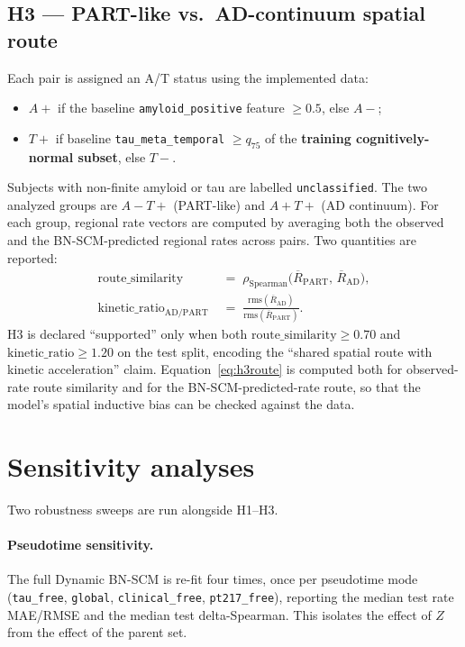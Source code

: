 \documentclass[11pt]{article}
\newcommand{\code}[1]{\texttt{#1}}
\begin{document}
\subsection{H3 --- PART-like vs.\ AD-continuum spatial route}

Each pair is assigned an A/T status using the implemented data:
\begin{itemize}[leftmargin=*,nosep]
  \item $A+$ if the baseline \code{amyloid\_positive} feature $\geq 0.5$, else $A-$;
  \item $T+$ if baseline \code{tau\_meta\_temporal} $\geq q_{75}$ of the \textbf{training cognitively-normal subset}, else $T-$.
\end{itemize}
Subjects with non-finite amyloid or tau are labelled \code{unclassified}.
The two analyzed groups are $A{-}T{+}$ (PART-like) and $A{+}T{+}$ (AD
continuum). For each group, regional rate vectors are computed by averaging
both the observed and the BN-SCM-predicted regional rates across pairs.
Two quantities are reported:
\begin{align}
\text{route\_similarity} &\;=\; \rho_{\text{Spearman}}\bigl( \overline{R}_{\text{PART}},\, \overline{R}_{\text{AD}} \bigr), \label{eq:h3route} \\
\text{kinetic\_ratio}_{\text{AD/PART}} &\;=\; \frac{\mathrm{rms}(\overline{R}_{\text{AD}})}{\mathrm{rms}(\overline{R}_{\text{PART}})}. \label{eq:h3kin}
\end{align}
H3 is declared ``supported'' only when both
$\text{route\_similarity} \geq 0.70$ and
$\text{kinetic\_ratio} \geq 1.20$ on the test split, encoding the
``shared spatial route with kinetic acceleration'' claim.
Equation~\eqref{eq:h3route} is computed both for observed-rate route
similarity and for the BN-SCM-predicted-rate route, so that the model's
spatial inductive bias can be checked against the data.

\section{Sensitivity analyses}

Two robustness sweeps are run alongside H1--H3.

\paragraph{Pseudotime sensitivity.} The full Dynamic BN-SCM is re-fit four
times, once per pseudotime mode (\code{tau\_free}, \code{global},
\code{clinical\_free}, \code{pt217\_free}), reporting the median test rate
MAE/RMSE and the median test delta-Spearman. This isolates the effect of
$Z$ from the effect of the parent set.
\end{document}
